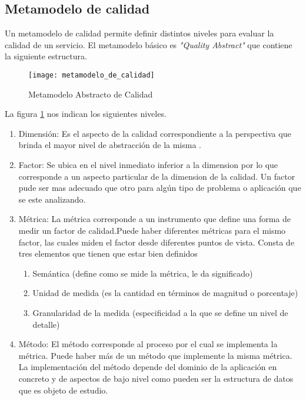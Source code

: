 \subsection{Metamodelo de calidad}
\label{MarcoConceptual:metamodelo_calidad}
Un metamodelo de calidad permite definir distintos niveles para evaluar la calidad de un servicio. El metamodelo básico es \emph{"Quality Abstract"} que contiene la siguiente estructura.  \cite{InCo:Seminario}
  \begin{figure}[h]
    \centering
    \texttt{[image: metamodelo\_de\_calidad]}
    \caption{Metamodelo Abstracto de Calidad}
    \label{figura:metamodelo_de_calidad}
  \end{figure}

La figura \ref{figura:metamodelo_de_calidad} nos indican los siguientes niveles.

			\begin{enumerate}
				\item Dimensión: Es el aspecto de la calidad correspondiente a la perspectiva que brinda el mayor nivel de abstracción de la misma \cite{InCo:Seminario}.
				\item Factor: Se ubica en el nivel inmediato inferior a la dimension por lo que corresponde a un aspecto particular de la dimension de la calidad. Un factor pude ser mas adecuado que otro para algún tipo de problema o aplicación que se este analizando.
				\item Métrica: La métrica corresponde a un instrumento que define una forma de medir un factor de calidad.\cite{InCo:Seminario}Puede haber diferentes métricas para el mismo factor, las cuales miden el factor desde diferentes puntos de vista. Consta de tres elementos que tienen que estar bien definidos
				\begin{enumerate}
				\item Semántica (define como se mide la métrica, le da significado)
				\item Unidad de medida (es la cantidad en términos de magnitud o porcentaje)
				\item Granularidad de la medida (especificidad a la que se define un nivel de detalle)
				\end{enumerate}
				\item Método: El método corresponde al proceso por el cual se implementa la métrica. Puede haber más de un método que implemente la misma métrica. La implementación del método depende del dominio de la aplicación en concreto y de aspectos de bajo nivel como pueden ser la estructura de datos que es objeto de estudio.
			\end{enumerate}


